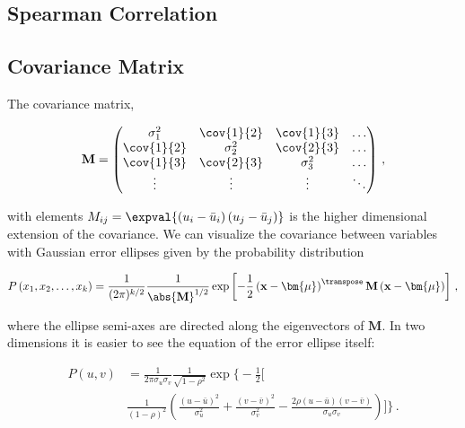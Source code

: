 \subsection{Spearman Correlation}
\label{stats:corr_covar:spearman}


\subsection{Covariance Matrix}
\label{stats:corr_covar:covar_matrix}

The covariance matrix,

\begin{align}
  \mathbf{M} = \begin{pmatrix}
    \sigma_1^2   & \cov{1}{2} & \cov{1}{3} & \ldots \\
    \cov{1}{2}   & \sigma_2^2 & \cov{2}{3} & \ldots \\
    \cov{1}{3}   & \cov{2}{3} & \sigma_3^2 & \ldots \\
    \vdots       & \vdots     & \vdots     & \ddots
  \end{pmatrix}\,,
\end{align}

\noindent with elements $M_{ij} = \expval{\left(u_{i} - \bar{u}_{i}\right)\left(u_{j}-\bar{u}_{j}\right)}$
is the higher dimensional extension of the covariance.
We can visualize the covariance between variables with
Gaussian error ellipses given by the probability distribution

\begin{equation}\label{eq:stats:P_error_ellipse_k}
P\left(x_{1},x_{2},\ldots,x_{k}\right) = \frac{1}{(2\pi)^{k/2}}\frac{1}{\abs{\mathbf{M}}^{1/2}}\exp\left[-\frac{1}{2}\left(\mathbf{x}-\bm{\mu}\right)^{\transpose}\mathbf{M}\left(\mathbf{x}-\bm{\mu}\right)\right]\,,
\end{equation}

\noindent where the ellipse semi-axes are directed along the eigenvectors of $\mathbf{M}$.
In two dimensions it is easier to see the equation of the error ellipse itself:

\begin{equation}\label{eq:stats:P_error_ellipse_2}
\begin{split}
P\left(u,v\right) &= \frac{1}{2\pi\sigma_{u}\sigma_{v}}\frac{1}{\sqrt{1-\rho^{2}}}\exp\bigg\{-\frac{1}{2}\bigg[ \\
&\frac{1}{(1-\rho)^{2}}\left(\frac{\left(u-\bar{u}\right)^{2}}{\sigma_{u}^{2}}+\frac{\left(v-\bar{v}\right)^{2}}{\sigma_{v}^{2}}-\frac{2\rho \left(u-\bar{u}\right)\left(v-\bar{v}\right)}{\sigma_{u}\sigma_{v}}\right)\bigg]\bigg\}\,.
\end{split}
\end{equation}

